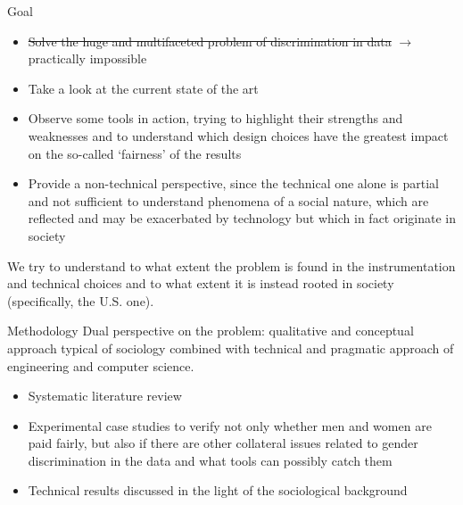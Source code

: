 \documentclass[usenames,dvipsnames]{beamer}
\begin{document}
    
    \begin{frame}{Goal}
        \begin{itemize}
            \item \st{Solve the huge and multifaceted problem of discrimination in data} $\rightarrow$ \alert{practically impossible}
            \item Take a look at the current state of the art
            \item Observe some tools in action, trying to highlight their strengths and weaknesses and to understand which design choices have the greatest impact on the so-called `\textcolor{defaultBlue}{fairness}' of the results
            \item Provide a non-technical perspective, since the technical one alone is partial and not sufficient to understand phenomena of a social nature, which are reflected and may be exacerbated by technology but which in fact originate in society
        \end{itemize}
We try to understand to what extent the problem is found in the \textcolor{defaultBlue}{instrumentation and technical choices} and to what extent it is instead rooted in \textcolor{defaultBlue}{society} (specifically, the U.S. one).
    \end{frame}
    
    
    \begin{frame}{Methodology}
        \textcolor{defaultBlue}{Dual perspective} on the problem: qualitative and conceptual approach typical of sociology combined with technical and pragmatic approach of engineering and computer science.
        	\begin{itemize}
        	    \item Systematic literature review
        	    \item Experimental case studies to verify not only whether men and women are paid fairly, but also if there are other collateral issues related to gender discrimination in the data and what tools can possibly catch them
        	    \item Technical results discussed in the light of the sociological background
        	\end{itemize}
    \end{frame}
    
\end{document}
